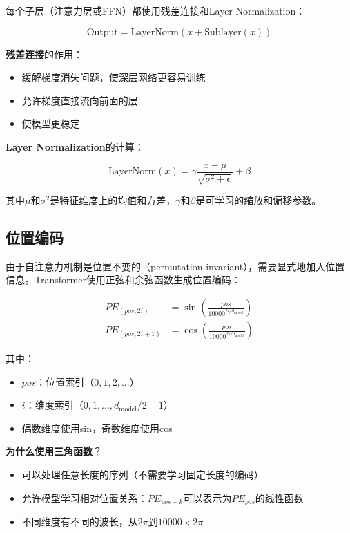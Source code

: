 \documentclass[UTF8,12pt,a4paper]{ctexart}
\begin{document}
每个子层（注意力层或FFN）都使用残差连接和Layer Normalization：

\begin{equation}
\text{Output} = \text{LayerNorm}(x + \text{Sublayer}(x))
\end{equation}

\textbf{残差连接}的作用：
\begin{itemize}
    \item 缓解梯度消失问题，使深层网络更容易训练
    \item 允许梯度直接流向前面的层
    \item 使模型更稳定
\end{itemize}

\textbf{Layer Normalization}的计算：

\begin{equation}
\text{LayerNorm}(x) = \gamma \frac{x - \mu}{\sqrt{\sigma^2 + \epsilon}} + \beta
\end{equation}

其中$\mu$和$\sigma^2$是特征维度上的均值和方差，$\gamma$和$\beta$是可学习的缩放和偏移参数。

\subsection{位置编码}

由于自注意力机制是位置不变的（permutation invariant），需要显式地加入位置信息。Transformer使用正弦和余弦函数生成位置编码：

\begin{align}
PE_{(pos, 2i)} &= \sin\left(\frac{pos}{10000^{2i/d_{\text{model}}}}\right) \\
PE_{(pos, 2i+1)} &= \cos\left(\frac{pos}{10000^{2i/d_{\text{model}}}}\right)
\end{align}

其中：
\begin{itemize}
    \item $pos$：位置索引（$0, 1, 2, ...$）
    \item $i$：维度索引（$0, 1, ..., d_{\text{model}}/2 - 1$）
    \item 偶数维度使用sin，奇数维度使用cos
\end{itemize}

\textbf{为什么使用三角函数}？
\begin{itemize}
    \item 可以处理任意长度的序列（不需要学习固定长度的编码）
    \item 允许模型学习相对位置关系：$PE_{pos+k}$可以表示为$PE_{pos}$的线性函数
    \item 不同维度有不同的波长，从$2\pi$到$10000 \times 2\pi$
\end{itemize}
\end{document}
